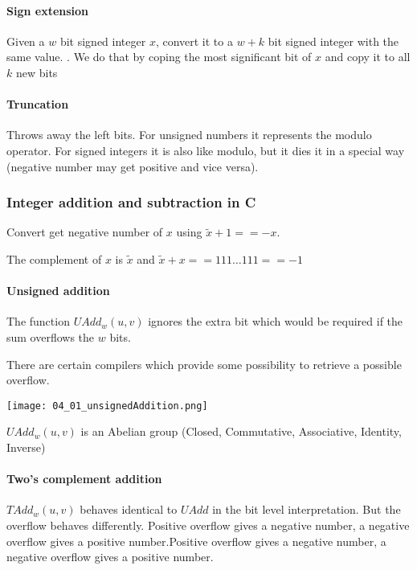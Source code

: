 

\paragraph{Sign extension}
Given a $w$ bit signed integer $x$, convert it to a $w + k$ bit signed integer with the same value.
.
We do that by coping the most significant bit of $x$ and copy it to all $k$ new bits

\paragraph{Truncation}
Throws away the left bits. For unsigned numbers it represents the modulo operator. For signed integers it is also like modulo, but it dies it in a special way (negative number may get positive and vice versa).

\subsubsection{Integer addition and subtraction in C}

Convert get negative number of $x$ using $\tilde x + 1 == -x$.

The complement of $x$ is $\tilde x$ and $\tilde x + x == 111 \dots 111 == -1$

\paragraph{Unsigned addition}
The function $UAdd_w(u,v)$ ignores the extra bit which would be required if the sum overflows the $w$ bits.

There are certain compilers which provide some possibility to retrieve a possible overflow.

\texttt{[image: 04\_01\_unsignedAddition.png]}

$UAdd_w(u,v)$ is an Abelian group (Closed, Commutative, Associative, Identity, Inverse)

\paragraph{Two's complement addition}
$TAdd_w(u,v)$ behaves identical to $UAdd$ in the bit level interpretation. But the overflow behaves differently. Positive overflow gives a negative number, a negative overflow gives a positive number.Positive overflow gives a negative number, a negative overflow gives a positive number.

